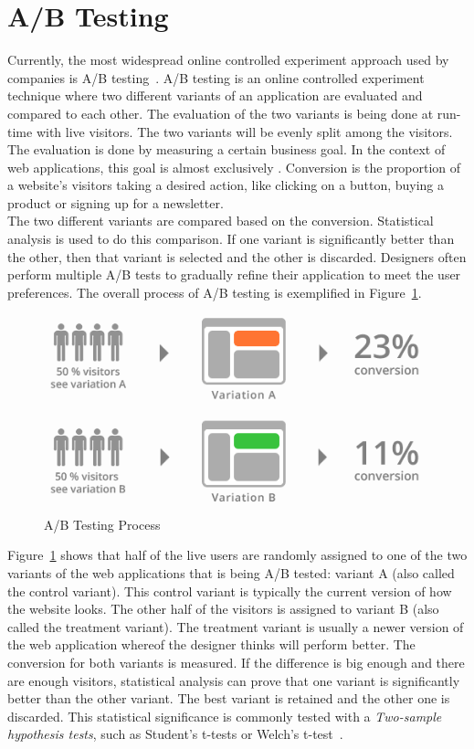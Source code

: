 \documentclass{report}
\begin{document}
\section{A/B Testing} 
Currently, the most widespread online controlled experiment approach used by companies is A/B testing~\cite{kohavi2013online}. A/B testing is an online controlled experiment technique where two different variants of an application are evaluated and compared to each other. The evaluation of the two variants is being done at run-time with live visitors. The two variants will be evenly split among the visitors. The evaluation is done by measuring a certain business goal. In the context of web applications, this goal is almost exclusively . Conversion is the proportion of a website’s visitors taking a desired action, like clicking on a button, buying a product or signing up for a newsletter.\\

The two different variants are compared based on the conversion. Statistical analysis is used to do this comparison. If one variant is significantly better than the other, then that variant is selected and the other is discarded. Designers often perform multiple A/B tests to gradually refine their application to meet the user preferences. The overall process of A/B testing is exemplified in Figure~\ref{fig:abtesting}.\\

\begin{figure}[ht]
	\centering
	\includegraphics[width=\linewidth]{imgs/ab_testing.png}
	\caption{A/B Testing Process}
	\label{fig:abtesting}
\end{figure}
Figure~\ref{fig:abtesting} shows that half of the live users are randomly assigned to one of the two variants of the web applications that is being A/B tested: variant A (also called the control variant). This control variant is typically the current version of how the website looks. The other half of the visitors is assigned to variant B (also called the treatment variant). The treatment variant is usually a newer version of the web application whereof the designer thinks will perform better. The conversion for both variants is measured. If the difference is big enough and there are enough visitors, statistical analysis can prove that one variant is significantly better than the other variant. The best variant is retained and the other one is discarded. This statistical significance is commonly tested with a \emph{Two-sample hypothesis tests}, such as Student's t-tests or Welch's t-test~\cite{kohavi2007practical}.\\
\end{document}
